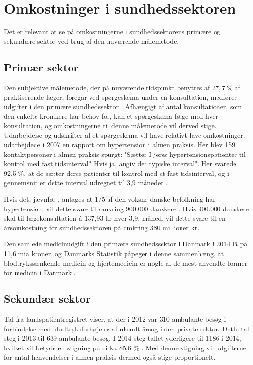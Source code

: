 \section{Omkostninger i sundhedssektoren}
Det er relevant at se på omkostningerne i sundhedssektorens primære og sekundære sektor ved brug af den nuværende målemetode. 

\subsection{Primær sektor}
Den subjektive målemetode, der på nuværende tidspunkt benyttes af $27,7~\%$ af praktiserende læger, foregår ved spørgeskema under en konsultation, medfører udgifter i den primære sundhedssektor \citep{munck2007}. Afhængigt af antal konsultationer, som den enkelte kronikere har behov for, kan et spørgeskema følge med hver konsultation, og omkostningerne til denne målemetode vil derved stige. Udarbejdelse og udskrifter af et spørgeskema vil have relativt lave omkostninger.
\citeauthor{munck2007} udarbejdede i 2007 en rapport om hypertension i almen praksis. Her blev 159 kontaktpersoner i almen praksis spurgt: "Sætter I jeres hypertensionspatienter til kontrol med fast tidsinterval? Hvis ja, angiv det typiske interval". Her svarede 92,5 \%, at de sætter deres patienter til kontrol med et fast tidsinterval, og i gennemsnit er dette interval udregnet til 3,9 måneder \citep{munck2007}. 

Hvis det, jævnfør \citeauthor{kronborg2008}, antages at $1/5$ af den voksne danske befolkning har hypertension, vil dette svare til omkring 900.000 danskere \citep{folketal2016}. Hvis 900.000 danskere skal til lægekonsultation á 137,93 kr hver 3,9. måned, vil dette svare til en årsomkostning for sundhedssektoren på omkring 380 millioner kr. 

Den samlede medicinudgift i den primære sundhedssektor i Danmark i 2014 lå på 11,6 mia kroner, og Danmarks Statistik påpeger i denne sammenhæng, at blodtrykssænkende medicin og hjertemedicin er nogle af de mest anvendte former for medicin i Danmark \citep{dst2016}. 

\subsection{Sekundær sektor}
Tal fra landspatientregistret viser, at der i 2012 var 310 ambulante besøg i forbindelse med blodtryksforhøjelse af ukendt årsag i den private sektor. Dette tal steg i 2013 til 639 ambulante besøg. I 2014 steg tallet yderligere til 1186 i 2014, hvilket vil betyde en stigning på cirka 85,6 \% \citep{sundhedsdatastyrelsen2016} . Med denne stigning vil udgifterne for antal henvendelser i almen praksis dermed også stige proportionelt. 
